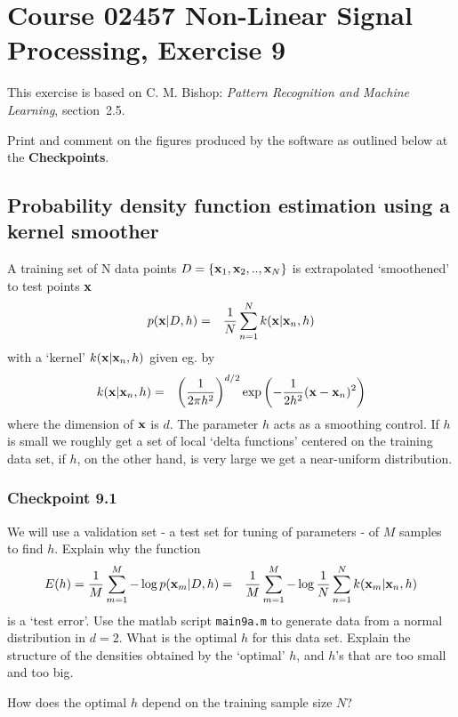\documentclass[12pt]{article}    %
\def\xb{{\bf x}}
\begin{document}
\section*{Course 02457 Non-Linear Signal Processing, Exercise 9}

This exercise is based on C. M. Bishop: {\em Pattern Recognition
and Machine Learning}, section~2.5.

Print and comment on the figures produced by the software as outlined below at the {\bf
Checkpoints}.

\subsection*{Probability density function estimation using a kernel smoother}
A training set of N data points $D=\{\xb_1,\xb_2,..,\xb_N\}$ is
extrapolated `smoothened'  to test points $\xb$
\begin{eqnarray}
p(\xb|D,h) &=& \frac{1}{N} \sum_{n=1}^{N} k(\xb|\xb_n,h) \nonumber
\end{eqnarray}
with a `kernel' $k(\xb|\xb_n,h)$ given eg. by
\begin{eqnarray}
k(\xb|\xb_n,h) &=& \left(\frac{1}{2\pi h^2}\right)^{d/2} \exp
\left(-\frac{1}{2h^2}(\xb-\xb_n)^2\right)\nonumber
\end{eqnarray}
where the dimension of $\xb$ is $d$.
The parameter $h$ acts as a smoothing control. If
$h$ is small we roughly get a set of local `delta functions' centered on the training
data set, if $h$, on the other hand, is very large we get a near-uniform distribution.

\subsubsection*{Checkpoint 9.1}
We will use a validation set  - a test set for tuning of parameters - of $M$ samples to find $h$.
Explain why the function
\begin{eqnarray}
E(h)= \frac{1}{M}\sum_{m=1}^{M} -\log p(\xb_m|D,h) &=& \frac{1}{M}\sum_{m=1}^{M} -\log \frac{1}{N} \sum_{n=1}^{N} k(\xb_m|\xb_n,h) \nonumber
\end{eqnarray}
is a `test error'. Use the matlab script {\tt main9a.m} to generate data from a normal distribution
in $d=2$. What is the optimal $h$ for this data set.
Explain the structure of the densities obtained by the `optimal' $h$,
and $h$'s that are too small and too big.

How does the optimal $h$ depend on the training sample size $N$?
\end{document}
